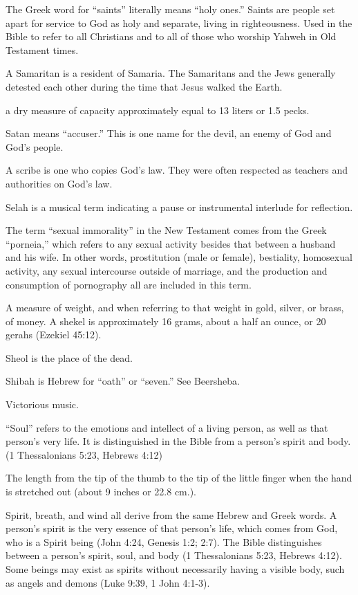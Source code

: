 \begin{multicols}{2}
The Greek word for {``}saints{''} literally means {``}holy ones.{''}
Saints are people set apart for service to God as holy and separate,
living in righteousness. Used in the Bible to refer to all Christians
and to all of those who worship Yahweh in Old Testament times.

A Samaritan is a resident of Samaria. The Samaritans and the Jews
generally detested each other during the time that Jesus walked the
Earth.

a dry measure of capacity approximately equal to 13 liters or 1.5
pecks.

Satan means {``}accuser.{''} This is one name for the devil, an enemy
of God and God's people.

A scribe is one who copies God's law. They were often respected as
teachers and authorities on God's law.

Selah is a musical term indicating a pause or instrumental interlude
for reflection.

The term {``}sexual immorality{''} in the New Testament comes from
the Greek {``}porneia,{''} which refers to any sexual activity
besides that between a husband and his wife. In other words,
prostitution (male or female), bestiality, homosexual activity, any
sexual intercourse outside of marriage, and the production and
consumption of pornography all are included in this term.

A measure of weight, and when referring to that weight in gold,
silver, or brass, of money. A shekel is approximately 16 grams, about
a half an ounce, or 20 gerahs (Ezekiel 45:12).

Sheol is the place of the dead.

Shibah is Hebrew for {``}oath{''} or {``}seven.{''} See Beersheba.

Victorious music.

{``}Soul{''} refers to the emotions and intellect of a living person,
as well as that person's very life. It is distinguished in the Bible
from a person's spirit and body. (1 Thessalonians 5:23, Hebrews
4:12)

The length from the tip of the thumb to the tip of the little finger
when the hand is stretched out (about 9 inches or 22.8 cm.).

Spirit, breath, and wind all derive from the same Hebrew and Greek
words. A person's spirit is the very essence of that person's life,
which comes from God, who is a Spirit being (John 4:24, Genesis 1:2;
2:7). The Bible distinguishes between a person's spirit, soul, and
body (1 Thessalonians 5:23, Hebrews 4:12). Some beings may exist as
spirits without necessarily having a visible body, such as angels and
demons (Luke 9:39, 1 John 4:1-3).


\end{multicols}
